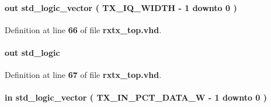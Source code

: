 \paragraph[{tx\+\_\+\+D\+IQ}]{ {\bfseries \textcolor{keywordflow}{out}\textcolor{vhdlchar}{ }} {\bfseries \textcolor{comment}{std\+\_\+logic\+\_\+vector}\textcolor{vhdlchar}{ }\textcolor{vhdlchar}{(}\textcolor{vhdlchar}{ }\textcolor{vhdlchar}{ }\textcolor{vhdlchar}{ }\textcolor{vhdlchar}{ }{\bfseries {\bf T\+X\+\_\+\+I\+Q\+\_\+\+W\+I\+D\+TH}} \textcolor{vhdlchar}{-\/}\textcolor{vhdlchar}{ } \textcolor{vhdldigit}{1} \textcolor{vhdlchar}{ }\textcolor{keywordflow}{downto}\textcolor{vhdlchar}{ }\textcolor{vhdlchar}{ } \textcolor{vhdldigit}{0} \textcolor{vhdlchar}{ }\textcolor{vhdlchar}{)}\textcolor{vhdlchar}{ }} \hspace{0.3cm}{\ttfamily [Port]}}\label{classrxtx__top_ad350befe370ccbff1b89126b2df7e732}


Definition at line {\bf 66} of file {\bf rxtx\+\_\+top.\+vhd}.

\paragraph[{tx\+\_\+fsync}]{ {\bfseries \textcolor{keywordflow}{out}\textcolor{vhdlchar}{ }} {\bfseries \textcolor{comment}{std\+\_\+logic}\textcolor{vhdlchar}{ }} \hspace{0.3cm}{\ttfamily [Port]}}\label{classrxtx__top_a4b6b2560ca5c6bd7b789874d2fbd7122}


Definition at line {\bf 67} of file {\bf rxtx\+\_\+top.\+vhd}.

\paragraph[{tx\+\_\+in\+\_\+pct\+\_\+data}]{ {\bfseries \textcolor{keywordflow}{in}\textcolor{vhdlchar}{ }} {\bfseries \textcolor{comment}{std\+\_\+logic\+\_\+vector}\textcolor{vhdlchar}{ }\textcolor{vhdlchar}{(}\textcolor{vhdlchar}{ }\textcolor{vhdlchar}{ }\textcolor{vhdlchar}{ }\textcolor{vhdlchar}{ }{\bfseries {\bf T\+X\+\_\+\+I\+N\+\_\+\+P\+C\+T\+\_\+\+D\+A\+T\+A\+\_\+W}} \textcolor{vhdlchar}{-\/}\textcolor{vhdlchar}{ } \textcolor{vhdldigit}{1} \textcolor{vhdlchar}{ }\textcolor{keywordflow}{downto}\textcolor{vhdlchar}{ }\textcolor{vhdlchar}{ } \textcolor{vhdldigit}{0} \textcolor{vhdlchar}{ }\textcolor{vhdlchar}{)}\textcolor{vhdlchar}{ }} \hspace{0.3cm}{\ttfamily [Port]}}\label{classrxtx__top_a59efb1357c1f7a998bd57b54be9a99ed}


